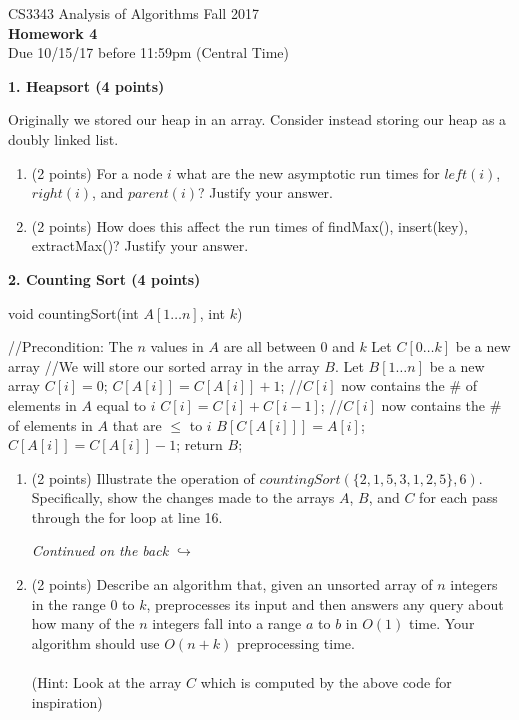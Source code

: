 \documentclass[12pt]{elsart}
\begin{document}
\pagestyle{empty}

\begin{center}
\Large  CS3343 Analysis of Algorithms Fall 2017 \\
\large {\bf Homework 4}\\
\normalsize Due 10/15/17 before 11:59pm (Central Time)
\end{center}

{\bf 1.  Heapsort (4 points)}

Originally we stored our heap in an array.  Consider instead storing our heap as a doubly linked list.  

\begin{enumerate}
   \item (2 points) For a node $i$ what are the new asymptotic run times for  $left(i)$, $right(i)$, and $parent(i)$?  Justify your answer.

  \item (2 points) How does this affect the run times of findMax(), insert(key), extractMax()?  Justify your answer.
\end{enumerate}

{\bf 2.  Counting Sort (4 points)}

\begin{algorithm}
\caption{void countingSort(int $A[1\ldots n]$, int $k$)}
 \begin{algorithmic}[1]
 \State //Precondition: The $n$ values in $A$ are all between $0$ and $k$
 \State Let $C[0\ldots k]$ be a new array
 \State //We will store our sorted array in the array $B$.
 \State Let $B[1\ldots n]$ be a new array 
        \State $C[i]=0$;
  \EndFor
{}
        \State $C[A[i]]=C[A[i]]+1$;
  \EndFor
\State //$C[i]$ now contains the \# of elements in $A$ equal to $i$
        \State $C[i]=C[i]+C[i-1]$;
  \EndFor
\State //$C[i]$ now contains the \# of elements in $A$ that are $\leq$ to $i$
        \State $B[C[A[i]]]=A[i]$;
        \State $C[A[i]]=C[A[i]]-1$;
  \EndFor
\State return $B$;
\end{algorithmic}
\end{algorithm}

\begin{enumerate}
   \item (2 points) Illustrate the operation of $countingSort(\{2,1,5,3,1,2,5\},6)$.  Specifically, show the changes made to the arrays $A$, $B$, and $C$ for each pass through the for loop at line 16.

\vspace*{0.5cm}
\hfill \textit{Continued on the back \(\hookrightarrow\)}

\newpage
   \item (2 points) Describe an algorithm that, given an unsorted array of $n$ integers in the range $0$ to $k$, preprocesses its
input and then answers any query about how many of the $n$ integers fall into a range $a$ to $b$ in $O(1)$ time. Your algorithm should use $O(n+k)$ preprocessing time.
\\\\(Hint: Look at the array $C$ which is computed by the above code for inspiration)
\end{enumerate}
\end{document}
